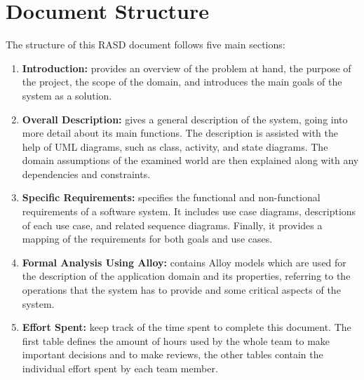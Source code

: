 \section{Document Structure}
The structure of this RASD document follows five main sections:
\begin{enumerate}
    \item \textbf{Introduction:}
          provides an overview of the problem at hand, the purpose of the project,
          the scope of the domain, and introduces the main goals of the system as a solution.

    \item \textbf{Overall Description:}
          gives a general description of the system, going into more detail about its main functions.
          The description is assisted with the help of UML diagrams, such as class, activity, and state diagrams.
          The domain assumptions of the examined world are then explained along with any dependencies and constraints.

    \item \textbf{Specific Requirements:}
          specifies the functional and non-functional requirements of a software system.
          It includes use case diagrams, descriptions of each use case, and related sequence diagrams.
          Finally, it provides a mapping of the requirements for both goals and use cases.

    \item \textbf{Formal Analysis Using Alloy:}
          contains Alloy models which are used for the description of the application domain and its properties,
          referring to the operations that the system has to provide and some critical aspects of the system.

    \item \textbf{Effort Spent:}
          keep track of the time spent to complete this document.
          The first table defines the amount of hours used by the whole team to make important decisions and to make reviews,
          the other tables contain the individual effort spent by each team member.
\end{enumerate}